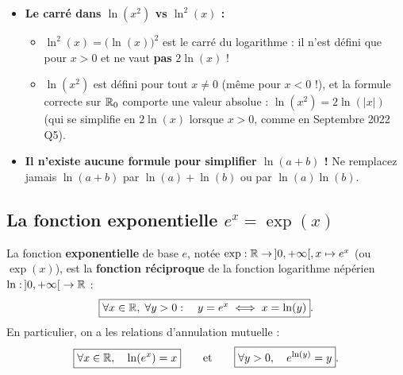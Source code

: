 \begin{attention}
\begin{itemize}
    \item \textbf{Le carré dans $\ln(x^2)$ vs $\ln^2(x)$ :}
    \begin{itemize}
        \item $\ln^2(x) = \bigl(\ln(x)\bigr)^2$ est le carré du logarithme : il n'est défini que pour $x > 0$ et ne vaut \textbf{pas} $2\ln(x)$ !
        \item $\ln(x^2)$ est défini pour tout $x \neq 0$ (même pour $x < 0$ !), et la formule correcte sur $\mathbb{R}_0$ comporte une valeur absolue : $\boxed{\ln(x^2) = 2\ln(|x|)}$ (qui se simplifie en $2\ln(x)$ lorsque $x > 0$, comme en Septembre 2022 Q5).
    \end{itemize}
    \item \textbf{Il n'existe aucune formule pour simplifier $\ln(a + b)$ !} Ne remplacez jamais $\ln(a+b)$ par $\ln(a) + \ln(b)$ ou par $\ln(a)\ln(b)$.
\end{itemize}
\end{attention}

\subsection{La fonction exponentielle $e^x = \exp(x)$}

\begin{definition}
La fonction \textbf{exponentielle} de base $e$, notée $\exp : \mathbb{R} \to \,]0, +\infty[, x \mapsto e^x$ (ou $\exp(x)$), est la \textbf{fonction réciproque} de la fonction logarithme népérien $\ln : \,]0, +\infty[ \;\to \mathbb{R}$ :
\[
    \boxed{\forall x \in \mathbb{R}, \;\forall y > 0 : \quad y = e^x \iff x = \ln(y)}.
\]
En particulier, on a les relations d'annulation mutuelle :
\[
    \boxed{\forall x \in \mathbb{R}, \quad \ln(e^x) = x} \qquad \text{et} \qquad \boxed{\forall y > 0, \quad e^{\ln(y)} = y}.
\]
\end{definition}

